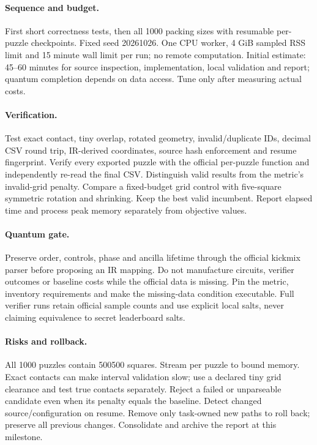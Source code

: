 \documentclass{article}
\begin{document}
\paragraph{Sequence and budget.} First short correctness tests, then all 1000 packing sizes with resumable per-puzzle checkpoints. Fixed seed 20261026. One CPU worker, 4 GiB sampled RSS limit and 15 minute wall limit per run; no remote computation. Initial estimate: 45--60 minutes for source inspection, implementation, local validation and report; quantum completion depends on data access. Tune only after measuring actual costs.
\paragraph{Verification.} Test exact contact, tiny overlap, rotated geometry, invalid/duplicate IDs, decimal CSV round trip, IR-derived coordinates, source hash enforcement and resume fingerprint. Verify every exported puzzle with the official per-puzzle function and independently re-read the final CSV. Distinguish valid results from the metric's invalid-grid penalty. Compare a fixed-budget grid control with five-square symmetric rotation and shrinking. Keep the best valid incumbent. Report elapsed time and process peak memory separately from objective values.
\paragraph{Quantum gate.} Preserve order, controls, phase and ancilla lifetime through the official kickmix parser before proposing an IR mapping. Do not manufacture circuits, verifier outcomes or baseline costs while the official data is missing. Pin the metric, inventory requirements and make the missing-data condition executable. Full verifier runs retain official sample counts and use explicit local salts, never claiming equivalence to secret leaderboard salts.
\paragraph{Risks and rollback.} All 1000 puzzles contain 500500 squares. Stream per puzzle to bound memory. Exact contacts can make interval validation slow; use a declared tiny grid clearance and test true contacts separately. Reject a failed or unparseable candidate even when its penalty equals the baseline. Detect changed source/configuration on resume. Remove only task-owned new paths to roll back; preserve all previous changes. Consolidate and archive the report at this milestone.
\begin{center}\end{center}
\end{document}
